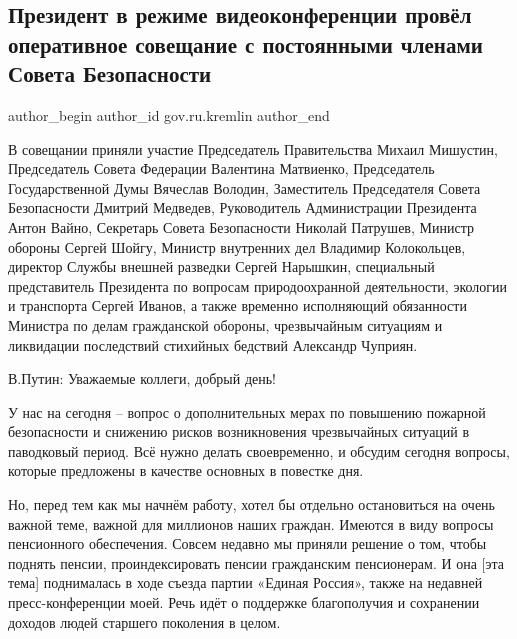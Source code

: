  
 
 
 
 
\subsection{Президент в режиме видеоконференции провёл оперативное совещание с постоянными членами Совета Безопасности}
\label{sec:21_01_2022.stz.gov.ru.kremlin.1.prezident_video_soveschanie_sovbez}
 
\ifcmt
 author_begin
   author_id gov.ru.kremlin
 author_end
\fi

В совещании приняли участие Председатель Правительства Михаил Мишустин,
Председатель Совета Федерации Валентина Матвиенко, Председатель Государственной
Думы Вячеслав Володин, Заместитель Председателя Совета Безопасности Дмитрий
Медведев, Руководитель Администрации Президента Антон Вайно, Секретарь Совета
Безопасности Николай Патрушев, Министр обороны Сергей Шойгу, Министр внутренних
дел Владимир Колокольцев, директор Службы внешней разведки Сергей Нарышкин,
специальный представитель Президента по вопросам природоохранной деятельности,
экологии и транспорта Сергей Иванов, а также временно исполняющий обязанности
Министра по делам гражданской обороны, чрезвычайным ситуациям и ликвидации
последствий стихийных бедствий Александр Чуприян.


В.Путин: Уважаемые коллеги, добрый день!

У нас на сегодня – вопрос о дополнительных мерах по повышению пожарной
безопасности и снижению рисков возникновения чрезвычайных ситуаций в паводковый
период. Всё нужно делать своевременно, и обсудим сегодня вопросы, которые
предложены в качестве основных в повестке дня.

Но, перед тем как мы начнём работу, хотел бы отдельно остановиться на очень
важной теме, важной для миллионов наших граждан. Имеются в виду вопросы
пенсионного обеспечения. Совсем недавно мы приняли решение о том, чтобы поднять
пенсии, проиндексировать пенсии гражданским пенсионерам. И она [эта тема]
поднималась в ходе съезда партии «Единая Россия», также на недавней
пресс-конференции моей. Речь идёт о поддержке благополучия и сохранении доходов
людей старшего поколения в целом.


